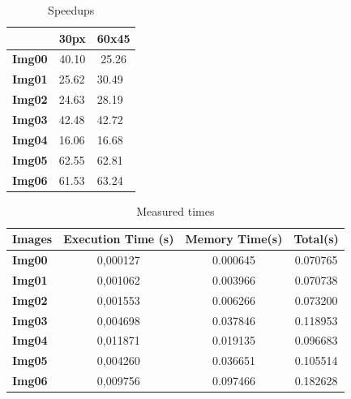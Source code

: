 \documentclass[a4paper]{article}
\begin{document}
\begin{table}[!ht]
\centering
\begin{tabular}{|l|l|l|}
\hline
\multicolumn{1}{|c|}{}               & \textbf{30px}              & \multicolumn{1}{c|}{\textbf{60x45}} \\ \hline
\multicolumn{1}{|c|}{\textbf{Img00}} & \multicolumn{1}{c|}{40.10} & \multicolumn{1}{c|}{25.26}          \\ \hline
\textbf{Img01}                       & 25.62                      & 30.49                               \\ \hline
\textbf{Img02}                       & 24.63                      & 28.19                               \\ \hline
\textbf{Img03}                       & 42.48                      & 42.72                               \\ \hline
\textbf{Img04}                       & 16.06                      & 16.68                               \\ \hline
\textbf{Img05}                       & 62.55                      & 62.81                               \\ \hline
\textbf{Img06}                       & 61.53                      & 63.24                               \\ \hline
\end{tabular}
\caption{Speedups}
\label{tab:histo_sp}
\end{table}
\FloatBarrier

\begin{table}[!ht]
\centering
\begin{tabular}{|l|c|c|c|}
\hline
\textbf{Images} & \textbf{Execution Time (s)} & \textbf{Memory Time(s)} & \textbf{Total(s)} \\ \hline
\textbf{Img00}  & 0,000127                    & 0.000645                & 0.070765          \\ \hline
\textbf{Img01}  & 0,001062                    & 0.003966                & 0.070738          \\ \hline
\textbf{Img02}  & 0,001553                    & 0.006266                & 0.073200          \\ \hline
\textbf{Img03}  & 0,004698                    & 0.037846                & 0.118953          \\ \hline
\textbf{Img04}  & 0,011871                    & 0.019135                & 0.096683          \\ \hline
\textbf{Img05}  & 0,004260                    & 0.036651                & 0.105514          \\ \hline
\textbf{Img06}  & 0,009756                    & 0.097466                & 0.182628          \\ \hline
\end{tabular}
\caption{Measured times}
\label{tab:histo_me}
\end{table}
\FloatBarrier
\end{document}
